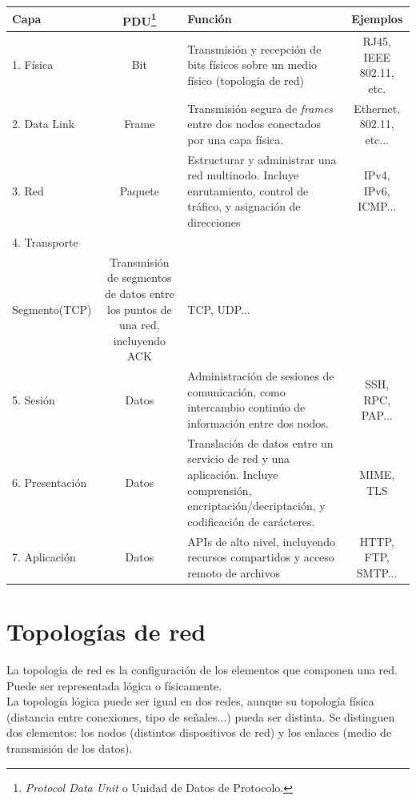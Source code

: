 \documentclass[a4paper, 11pt]{report} %
\begin{document}
\renewcommand{\arraystretch}{1} %
\noindent\linespread{1}
\begin{tabularx}{\linewidth}{ | l >{\footnotesize}c >{\footnotesize}X >{\footnotesize}c | }
	\rowcolor{header} \hline
	\textbf{Capa} & \textbf{PDU\footnote{\textit{Protocol Data Unit} o Unidad de Datos de Protocolo.}} & \textbf{Función} & \textbf{Ejemplos} \\ \hline
	1. Física & Bit & Transmisión y recepción de bits físicos sobre un medio físico (topología de red) & 	 RJ45, IEEE 802.11, etc. \\
	\label{osi}
	2. Data Link & Frame & Transmisión segura de \textit{frames} entre dos nodos conectados por una capa física. & Ethernet, 802.11, etc...\\
	3. Red & Paquete & Estructurar y administrar una red multinodo. Incluye enrutamiento, control de tráfico, y asignación de direcciones & IPv4, IPv6, ICMP... \\
	4. Transporte & \begin{tabular}[t]{@{}c@{}}Datagrama(UDP)\\Segmento(TCP)  \end{tabular} &
	Transmisión de segmentos de datos entre los puntos de una red, incluyendo ACK & TCP, UDP...\\
	5. Sesión & Datos & Administración de sesiones de comunicación, como intercambio continúo de información entre dos nodos. & SSH, RPC, PAP...\\ 
	6. Presentación & Datos & Translación de datos entre un servicio de red y una aplicación. Incluye comprensión, encriptación/decriptación, y codificación de carácteres. & MIME, TLS \\
	7. Aplicación & Datos & APIs de alto nivel, incluyendo recursos compartidos y acceso remoto de archivos & HTTP, FTP, SMTP... \\ \hline
\end{tabularx}

\newpage
\section{Topologías de red}
\label{topdred}
La \gls{topologia} de red es la configuración de los elementos que componen una red. Puede ser representada lógica o físicamente. \\
La topología lógica puede ser igual en dos redes, aunque su topología física (distancia entre conexiones, tipo de señales...) pueda ser distinta. Se distinguen dos elementos: los nodos (distintos dispositivos de red) y los enlaces (medio de transmisión de los datos).
\end{document}

